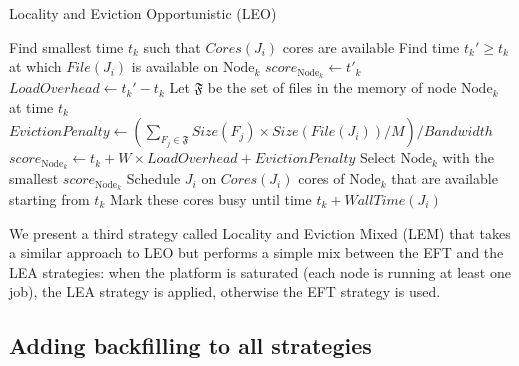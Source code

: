 \documentclass[conference]{IEEEtran}
\newcommand{\Node}[1]{\ensuremath{\mathrm{Node}_{#1}}\xspace}
\newcommand{\file}{\ensuremath{\mathit{File}}\xspace}
\newcommand{\size}{\ensuremath{\mathit{Size}}\xspace}
\newcommand{\memory}{\ensuremath{\mathit{M}}\xspace}
\newcommand{\bandwidth}{\mathit{Bandwidth}\xspace}
\newcommand{\core}{\mathit{Cores}\xspace}
\newcommand{\walltime}{\mathit{WallTime}\xspace}
\newcommand{\nodeset}{\ensuremath{\mathbb{N}}\xspace}
\newcommand{\rev}[1]{{\color{black}{#1}}}
\begin{document}
\begin{algorithm}[t]
\caption{Locality and Eviction Opportunistic (LEO)}\label{algo.leo}
\begin{algorithmic}[1]
		\ForEach{$\Node{k} \in \nodeset$}
			\State Find smallest time $t_k$ such that $\core(J_i)$ cores are available
			\State Find time $t_k'\geq t_k$ at which $\file(J_i)$ is available on $\Node{k}$
				\State $score_{\Node{k}} \gets t'_k$
			\Else
				\State $\mathit{LoadOverhead} \gets t_k' - t_k$ %
				\State Let $\mathfrak{F}$ be the set of files in the memory of node \Node{k} at time $t_k$
				\State $\mathit{EvictionPenalty} \gets
				(\sum_{F_j\in\mathfrak{F}}\size(F_j) \times \size(\file(J_i))/\memory)/\bandwidth$
			         \State $score_{\Node{k}} \gets t_k + W \times \mathit{LoadOverhead} + \mathit{EvictionPenalty}$
			\EndIf
		\EndFor
                \State Select \Node{k} with the smallest $score_{\Node{k}}$
                \State Schedule $J_i$ on $\core(J_i)$ cores of \Node{k} that are available starting from $t_k$
                \State Mark these cores busy until time $t_k +\walltime(J_i)$
	\EndFor
\end{algorithmic}
\end{algorithm}

We present a third strategy called Locality and Eviction Mixed (LEM)
that takes a similar approach to
LEO but performs a simple mix between the EFT and the LEA strategies:
when the platform is saturated (each node is running
at least one job), the LEA strategy is applied,
otherwise the EFT strategy is used.
 


\subsection{Adding backfilling to all strategies}
\end{document}
